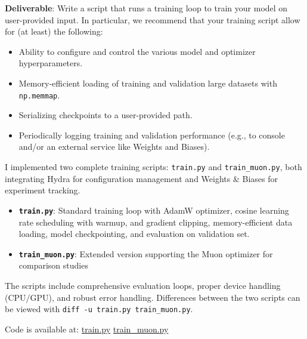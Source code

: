 
\textbf{Deliverable}: Write a script that runs a training loop to train your model on user-provided input. In particular, we recommend that your training script allow for (at least) the following:

\begin{itemize}
    \item Ability to configure and control the various model and optimizer hyperparameters.
    \item Memory-efficient loading of training and validation large datasets with \lstinline{np.memmap}.
    \item Serializing checkpoints to a user-provided path.
    \item Periodically logging training and validation performance (e.g., to console and/or an external service like Weights and Biases).
\end{itemize}

\begin{answer}
I implemented two complete training scripts: \lstinline{train.py} and \lstinline{train_muon.py}, both integrating Hydra for configuration management and Weights \& Biases for experiment tracking.

\begin{itemize}
    \item \textbf{\lstinline{train.py}}: Standard training loop with AdamW optimizer, cosine learning rate scheduling with warmup, and gradient clipping, memory-efficient data loading, model checkpointing, and evaluation on validation set.
    \item \textbf{\lstinline{train_muon.py}}: Extended version supporting the Muon optimizer for comparison studies
\end{itemize}

The scripts include comprehensive evaluation loops, proper device handling (CPU/GPU), and robust error handling. Differences between the two scripts can be viewed with \lstinline{diff -u train.py train_muon.py}.

Code is available at:
\href{https://github.com/donglinkang2021/assignment1-basics/blob/main/train.py}{train.py} 
\href{https://github.com/donglinkang2021/assignment1-basics/blob/main/train_muon.py}{train\_muon.py}

\end{answer}
